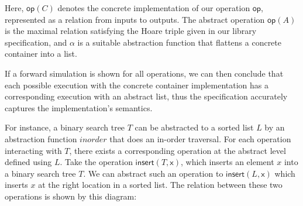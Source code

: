 \noindent Here, $\mathsf{op(\textit{C})}$ denotes the concrete implementation of our operation $\mathsf{op}$, represented as a relation from inputs to outputs.
The abstract operation $\mathsf{op(\textit{A})}$ is the maximal relation satisfying the Hoare triple given in our library specification, and $\alpha$ is a suitable abstraction function that 
flattens a concrete container into a list. 

If a forward simulation is shown for all operations, we can then conclude that each possible execution with the concrete container implementation has a corresponding execution with an abstract list, thus the specification accurately captures the implementation's semantics.

For instance, a binary search tree $T$ can be abstracted to a sorted list $L$ by an abstraction function $\mathit{inorder}$ that does an in-order traversal. For each operation interacting with $T$, there exists a corresponding operation at the abstract level defined using $L$. 
Take the operation $\mathsf{insert(\textit{T},x)}$, which inserts an element $x$ into a binary search tree $T$. We can abstract such an operation to $\mathsf{insert(\textit{L},x)}$ which inserts $x$ at the right location in a sorted list. The relation between these two operations is shown by this diagram:
\vspace{-.4em}
\begin{center}
\end{center}
\vspace{-.4em}
